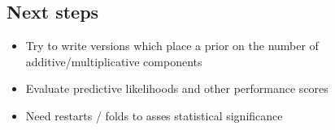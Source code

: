 \documentclass[twoside,11pt]{article}
\begin{document}
\subsection{Next steps}

\begin{itemize}
\item Try to write versions which place a prior on the number of additive/multiplicative components
\item Evaluate predictive likelihoods and other performance scores
\item Need restarts / folds to asses statistical significance
\end{itemize}

\newpage


\vskip 0.2in

\end{document}
